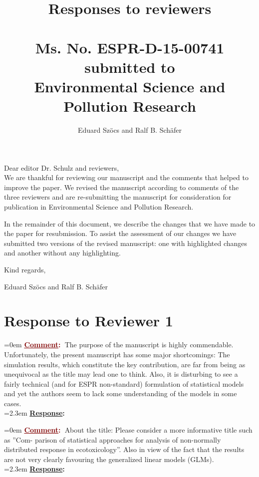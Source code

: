 \documentclass[12pt]{article}
\newcommand{\comment}[0]{\vspace{1em} \noindent \hangindent=0em \textbf{\textcolor{Maroon}{\uline{Comment}:~}}}
\newcommand{\response}[0]{\\\vspace{0.1em} \hangindent=2.3em \textbf{\textcolor{NavyBlue}{\uline{Response}:~}}}
\begin{document}
\title{Responses to reviewers\\~\\Ms. No. ESPR-D-15-00741\\submitted to\\Environmental Science and Pollution Research}

\author{Eduard Szöcs and Ralf B. Schäfer}

\maketitle
\noindent Dear editor Dr. Schulz  and reviewers,\\

We are thankful for reviewing our manuscript and the comments that helped to improve the paper. 
We revised the manuscript according to comments of the three reviewers and are re-submitting the manuscript for consideration for publication in Environmental Science and Pollution Research. 

In the remainder of this document, we describe the changes that we have made to the paper for resubmission. To assist the assessment of our changes we have submitted two versions of the revised manuscript: one with highlighted changes and another without any highlighting.

\vspace{2em}
\hfill Kind regards,

\hfill Eduard Szöcs and Ralf B. Schäfer

\newpage
\section{Response to Reviewer 1}

\comment The purpose of the manuscript is highly commendable. Unfortunately, the
present manuscript has some major shortcomings: The simulation results,
which constitute the key contribution, are far from being as unequivocal as
the title may lead one to think. Also, it is disturbing to see a fairly technical
(and for ESPR non-standard) formulation of statistical models and yet the
authors seem to lack some understanding of the models in some cases.
\response

\comment About the title: Please consider a more informative title such as ”Com-
parison of statistical approaches for analysis of non-normally distributed
response in ecotoxicology”. Also in view of the fact that the results are
not very clearly favouring the generalized linear models (GLMs).
\response
\end{document}
